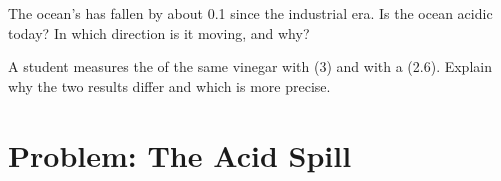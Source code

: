 \begin{exercise}[$\star\star\star$]\label{exo:g9:acids-bases-ph:11}
The ocean's  has fallen by about 0.1 since the industrial era. Is the
ocean acidic today? In which direction is it moving, and why?
\end{exercise}

\begin{exercise}[$\star\star\star$]\label{exo:g9:acids-bases-ph:12}
A student measures the  of the same vinegar with  (3) and with
a  (2.6). Explain why the two results differ and which is more
precise.
\end{exercise}

\section{Problem: The Acid Spill}

